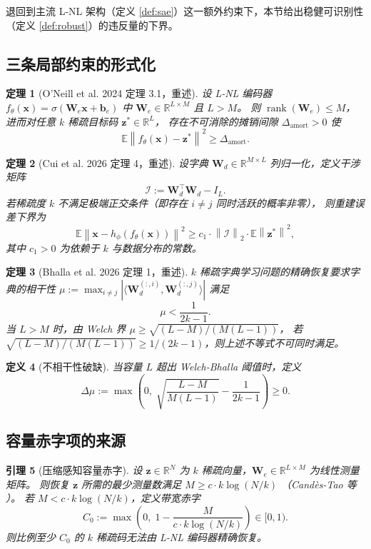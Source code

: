 \documentclass[11pt,a4paper]{article}
\newtheorem{theorem}{定理}
\newtheorem{lemma}[theorem]{引理}
\newtheorem{definition}[theorem]{定义}
\theoremstyle{remark}
\DeclareMathOperator{\rank}{rank}
\newcommand{\R}{\mathbb{R}}
\newcommand{\Z}{\bm{z}}
\newcommand{\X}{\bm{x}}
\newcommand{\W}{\bm{W}}
\newcommand{\I}{\mathcal{I}}
\newcommand{\norm}[1]{\left\lVert#1\right\rVert}
\begin{document}
退回到主流 L-NL 架构（定义 \ref{def:sae}）这一额外约束下，本节给出稳健可识别性
（定义 \ref{def:robust}）的违反量的下界。

\subsection{三条局部约束的形式化}

\begin{theorem}[O'Neill et al. 2024 \cite{oneill2024} 定理 3.1，重述]\label{thm:oneill}
设 L-NL 编码器 $f_\theta(\X) = \sigma(\W_e \X + \bm{b}_e)$ 中 $\W_e \in \R^{L \times M}$ 且 $L > M$。
则 $\rank(\W_e) \leq M$，进而对任意 $k$ 稀疏目标码 $\Z^\ast \in \R^L$，
存在不可消除的摊销间隙 $\Delta_{\mathrm{amort}} > 0$ 使
\[
\mathbb{E} \norm{f_\theta(\X) - \Z^\ast}^2 \geq \Delta_{\mathrm{amort}}.
\]
\end{theorem}

\begin{theorem}[Cui et al. 2026 \cite{cui2026} 定理 4，重述]\label{thm:cui}
设字典 $\W_d \in \R^{M \times L}$ 列归一化，定义干涉矩阵
\[
\I := \W_d^\top \W_d - I_L.
\]
若稀疏度 $k$ 不满足极端正交条件（即存在 $i \neq j$ 同时活跃的概率非零），
则重建误差下界为
\[
\mathbb{E} \norm{\X - h_\phi(f_\theta(\X))}^2 \geq c_1 \cdot \norm{\I}_2 \cdot \mathbb{E} \norm{\Z^\ast}^2,
\]
其中 $c_1 > 0$ 为依赖于 $k$ 与数据分布的常数。
\end{theorem}

\begin{theorem}[Bhalla et al. 2026 \cite{bhalla2026} 定理 1，重述]\label{thm:bhalla}
$k$ 稀疏字典学习问题的精确恢复要求字典的相干性
$\mu := \max_{i \neq j} |\langle \W_d^{(:,i)}, \W_d^{(:,j)}\rangle|$
满足
\[
\mu < \frac{1}{2k - 1}.
\]
当 $L > M$ 时，由 Welch 界 $\mu \geq \sqrt{(L-M)/(M(L-1))}$，
若 $\sqrt{(L-M)/(M(L-1))} \geq 1/(2k-1)$，则上述不等式不可同时满足。
\end{theorem}

\begin{definition}[不相干性破缺]\label{def:dmu}
当容量 $L$ 超出 Welch-Bhalla 阈值时，定义
\[
\Delta\mu := \max\left(0,\; \sqrt{\frac{L-M}{M(L-1)}} - \frac{1}{2k-1}\right) \geq 0.
\]
\end{definition}

\subsection{容量赤字项的来源}

\begin{lemma}[压缩感知容量赤字]\label{lem:capacity}
设 $\Z \in \R^N$ 为 $k$ 稀疏向量，$\W_e \in \R^{L \times M}$ 为线性测量矩阵。
则恢复 $\Z$ 所需的最少测量数满足 $M \geq c \cdot k \log(N/k)$
（Candès-Tao 等 \cite{candes2006compressive,candes2008restricted}）。
若 $M < c \cdot k \log(N/k)$，定义带宽赤字
\[
C_0 := \max\left(0,\; 1 - \frac{M}{c \cdot k \log(N/k)}\right) \in [0, 1).
\]
则比例至少 $C_0$ 的 $k$ 稀疏码无法由 L-NL 编码器精确恢复。
\end{lemma}
\end{document}
